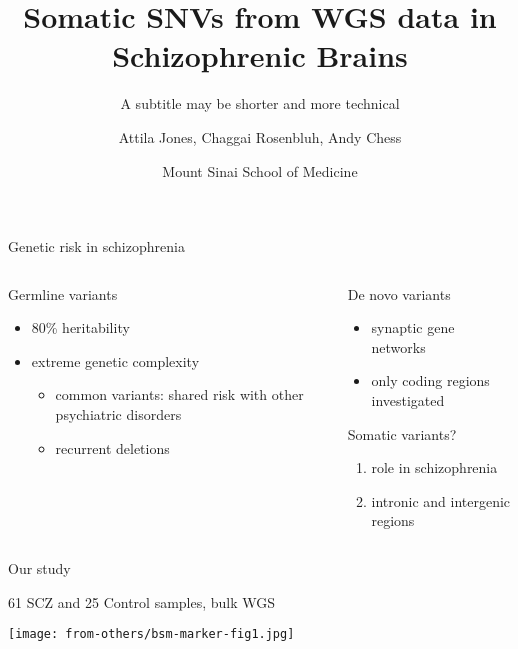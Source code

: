 \documentclass[usenames,dvipsnames]{beamer}
\title{Somatic SNVs from WGS data in Schizophrenic Brains}
\subtitle{A subtitle may be shorter and more technical}
\author{Attila Jones, Chaggai Rosenbluh, Andy Chess}
\date{Mount Sinai School of Medicine}
\begin{document}
\maketitle


\begin{frame}{Genetic risk in schizophrenia}
\begin{columns}[t]
\begin{column}{0.5\textwidth}
Germline variants
\begin{itemize}
\item 80\% heritability
\item extreme genetic complexity
\begin{itemize}
\item common variants: shared risk with other psychiatric disorders
\item recurrent deletions%
\end{itemize}
\end{itemize}
\end{column}
\begin{column}{0.5\textwidth}
De novo variants
\begin{itemize}
        \item synaptic gene networks
	\item only coding regions investigated%
\end{itemize}
\vfill
Somatic variants?
\begin{enumerate}
\item role in schizophrenia
\item intronic and intergenic regions
\end{enumerate}
\end{column}
\end{columns}
\end{frame}


\begin{frame}{Our study}
\begin{center}
61 SCZ and 25 Control samples, bulk WGS
\end{center}
\texttt{[image: from-others/bsm-marker-fig1.jpg]}
\end{frame}
\end{document}
